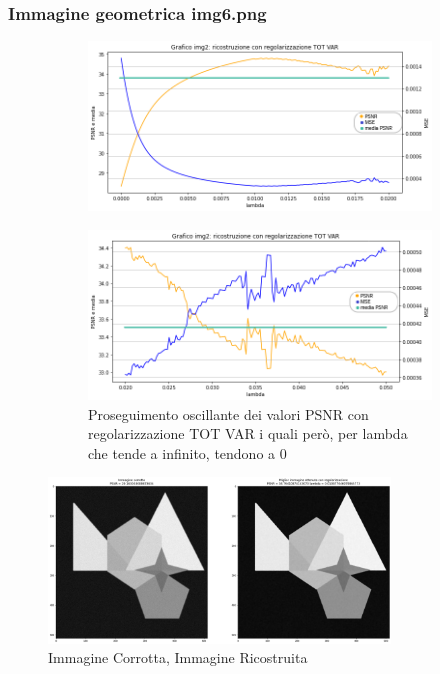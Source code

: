 \newpage
{\color{rred}\subsubsection{Immagine geometrica img6.png}}
\begin{figure}[H]
    \centering
    \begin{subfigure}{0.8\textwidth}
    \includegraphics[width=\textwidth]{IMMAGINI_RELAZIONE/grafico6TOTVAR_riserva.png}
    \end{subfigure}
    \begin{subfigure}{0.8\textwidth}
        \includegraphics[width=\textwidth]{IMMAGINI_RELAZIONE/proseguimentoGraficoTOTVAR6.png}
        \caption{Proseguimento oscillante dei valori PSNR con regolarizzazione TOT VAR i quali però, per lambda che tende a infinito, tendono a 0}
    \end{subfigure}
    \includegraphics[width=0.81\textwidth]{IMMAGINI_RELAZIONE/ricostruzione6TOTVAR.png}
    \caption{Immagine Corrotta, Immagine Ricostruita}
\end{figure}
